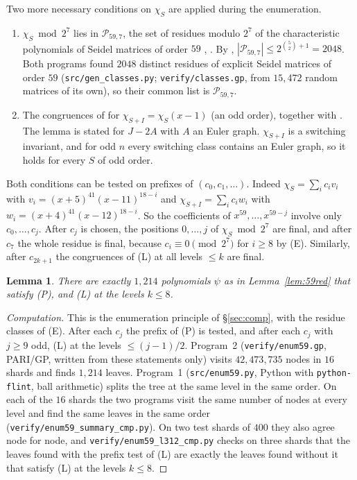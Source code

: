 \documentclass[11pt]{article}
\newtheorem{lemma}[theorem]{Lemma}
\theoremstyle{definition}
\begin{document}
Two more necessary conditions on $\chi_S$ are applied during the enumeration.
\begin{enumerate}
\item[(P)] $\chi_S\bmod2^7$ lies in $\mathcal P_{59,7}$, the set of residues modulo $2^7$ of the
characteristic polynomials of Seidel matrices of order $59$ \cite[\S3]{GY19}, \cite[\S5]{GSY23}. By
\cite[Cor.~3.13]{GY19}, $|\mathcal P_{59,7}|\le2^{\binom52+1}=2048$. Both programs found $2048$
distinct residues of explicit Seidel matrices of order $59$ (\texttt{src/gen\_classes.py};
\texttt{verify/classes.gp}, from $15{,}472$ random matrices of its own), so their common list is
$\mathcal P_{59,7}$.
\item[(L)] The congruences of \cite[Lemma~3.12]{GY19} for $\chi_{S+I}=\chi_S(x-1)$ (an odd order),
together with \cite[Remark~3.3, Lemmas~3.1, 3.8]{GY19}. The lemma is stated for $J-2A$ with $A$ an
Euler graph. $\chi_{S+I}$ is a switching invariant, and for odd $n$ every switching class contains an
Euler graph, so it holds for every $S$ of odd order.
\end{enumerate}
Both conditions can be tested on prefixes of $(c_0,c_1,\dots)$. Indeed
$\chi_S=\sum_ic_iv_i$ with $v_i=(x+5)^{41}(x-11)^{18-i}$ and $\chi_{S+I}=\sum_ic_iw_i$ with
$w_i=(x+4)^{41}(x-12)^{18-i}$. So the coefficients of $x^{59},\dots,x^{59-j}$ involve only
$c_0,\dots,c_j$. After $c_j$ is chosen, the positions $0,\dots,j$ of $\chi_S\bmod2^7$ are final, and
after $c_7$ the whole residue is final, because $c_i\equiv0\pmod{2^7}$ for $i\ge8$ by (E). Similarly,
after $c_{2k+1}$ the congruences of (L) at all levels $\le k$ are final.

\begin{lemma}\label{lem:59enum}
There are exactly $1{,}214$ polynomials $\psi$ as in Lemma~\ref{lem:59red} that satisfy (P), and (L)
at the levels $k\le8$.
\end{lemma}
\begin{proof}[Computation]
This is the enumeration principle of \S\ref{sec:comp}, with the residue classes of (E). After each
$c_j$ the prefix of (P) is tested, and after each $c_j$ with $j\ge9$ odd, (L) at the levels
$\le(j-1)/2$. Program~2 (\texttt{verify/enum59.gp}, PARI/GP, written from these statements only)
visits $42{,}473{,}735$ nodes in $16$ shards and finds $1{,}214$ leaves. Program~1
(\texttt{src/enum59.py}, Python with \texttt{python-flint}, ball arithmetic) splits the tree at the
same level in the same order. On each of the $16$ shards the two programs visit the same number of
nodes at every level and find the same leaves in the same order
(\texttt{verify/enum59\_summary\_cmp.py}). On two test shards of $400$ they
also agree node for node, and \texttt{verify/enum59\_l312\_cmp.py} checks on
three shards that the leaves found with the prefix test of (L) are exactly the leaves found without it
that satisfy (L) at the levels $k\le8$.
\end{proof}
\end{document}
